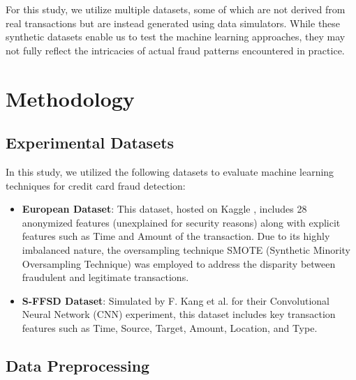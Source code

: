 \documentclass{article}
\begin{document}
For this study, we utilize multiple datasets, some of which are not derived from real transactions but are instead generated using data simulators. While these synthetic datasets enable us to test the machine learning approaches, they may not fully reflect the intricacies of actual fraud patterns encountered in practice.

\section{Methodology}

\subsection{Experimental Datasets}

In this study, we utilized the following datasets to evaluate machine learning techniques for credit card fraud detection:

\begin{itemize}
    \item \textbf{European Dataset}: This dataset, hosted on Kaggle \cite{kaggle_european}, includes 28 anonymized features (unexplained for security reasons) along with explicit features such as Time and Amount of the transaction. Due to its highly imbalanced nature, the oversampling technique SMOTE (Synthetic Minority Oversampling Technique) \cite{chawla2002smote} was employed to address the disparity between fraudulent and legitimate transactions.

    \item \textbf{S-FFSD Dataset}: Simulated by F. Kang et al\cite{kang2018sffsd}. for their Convolutional Neural Network (CNN) experiment, this dataset includes key transaction features such as Time, Source, Target, Amount, Location, and Type.

\end{itemize}

\subsection{Data Preprocessing}
\end{document}
